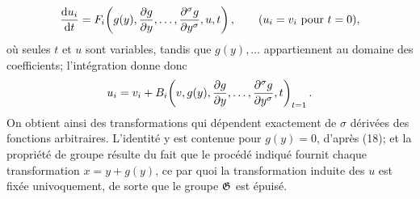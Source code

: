 \[
\frac{\mathrm d u_i}{\mathrm d t}
=
F_i\!\left(g(y),\frac{\partial g}{\partial y},\ldots,\frac{\partial^\sigma g}{\partial y^\sigma},u,t\right),
\qquad (u_i=v_i\ \text{pour }t=0),
\]
où seules \(t\) et \(u\) sont variables, tandis que \(g(y),\ldots\) appartiennent au domaine des coefficients; l'intégration donne donc
\[
u_i=v_i+
B_i\!\left(v,g(y),\frac{\partial g}{\partial y},\ldots,\frac{\partial^\sigma g}{\partial y^\sigma},t\right)_{t=1}.
\]
On obtient ainsi des transformations qui dépendent exactement de \(\sigma\) dérivées des fonctions arbitraires. L'identité y est contenue pour \(g(y)=0\), d'après (18); et la propriété de groupe résulte du fait que le procédé indiqué fournit chaque transformation \(x=y+g(y)\), ce par quoi la transformation induite des \(u\) est fixée univoquement, de sorte que le groupe \(\mathfrak G\) est épuisé.

